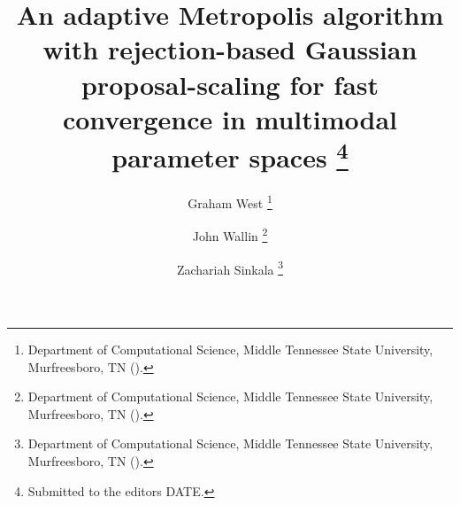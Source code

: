 

\usepackage[utf8]{inputenc}
\usepackage[english]{babel}
\usepackage{lipsum}
\usepackage{amsfonts}
\usepackage{graphicx}
\usepackage{epstopdf}
\usepackage{algorithmic}
\usepackage{textpos}
\usepackage{verbatim}
\usepackage{textcomp}
\usepackage{varwidth}


\newenvironment{tight_enum}{
\begin{enumerate}[label=\alph*.]
\setlength{\itemsep}{0pt}
\setlength{\parskip}{0pt}
}{\end{enumerate}}

\ifpdf
\else
\fi

\usepackage{enumitem}

\newcommand{\creflastconjunction}{, and~}



\title{An adaptive Metropolis algorithm with rejection-based Gaussian proposal-scaling for fast convergence in multimodal parameter spaces \thanks{Submitted to the editors DATE.
}}

\author{Graham West \thanks{Department of Computational Science, Middle Tennessee State University, Murfreesboro, TN 
  ().}
\and John Wallin \thanks{Department of Computational Science, Middle Tennessee State University, Murfreesboro, TN ().}
\and Zachariah Sinkala \thanks{Department of Computational Science, Middle Tennessee State University, Murfreesboro, TN ().}
}

\usepackage{amsopn}
\DeclareMathOperator{\diag}{diag}


